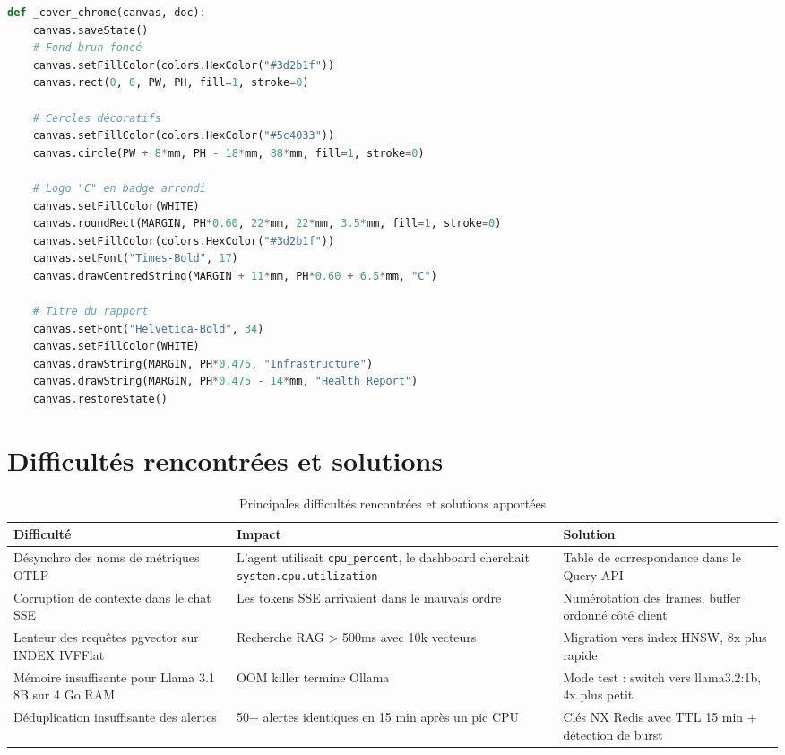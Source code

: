 \begin{lstlisting}[language=Python, caption={Extrait de \texttt{reports.py} --- page de couverture}]
def _cover_chrome(canvas, doc):
    canvas.saveState()
    # Fond brun foncé
    canvas.setFillColor(colors.HexColor("#3d2b1f"))
    canvas.rect(0, 0, PW, PH, fill=1, stroke=0)

    # Cercles décoratifs
    canvas.setFillColor(colors.HexColor("#5c4033"))
    canvas.circle(PW + 8*mm, PH - 18*mm, 88*mm, fill=1, stroke=0)

    # Logo "C" en badge arrondi
    canvas.setFillColor(WHITE)
    canvas.roundRect(MARGIN, PH*0.60, 22*mm, 22*mm, 3.5*mm, fill=1, stroke=0)
    canvas.setFillColor(colors.HexColor("#3d2b1f"))
    canvas.setFont("Times-Bold", 17)
    canvas.drawCentredString(MARGIN + 11*mm, PH*0.60 + 6.5*mm, "C")

    # Titre du rapport
    canvas.setFont("Helvetica-Bold", 34)
    canvas.setFillColor(WHITE)
    canvas.drawString(MARGIN, PH*0.475, "Infrastructure")
    canvas.drawString(MARGIN, PH*0.475 - 14*mm, "Health Report")
    canvas.restoreState()
\end{lstlisting}

\section{Difficultés rencontrées et solutions}

\begin{table}[H]
\centering
\caption{Principales difficultés rencontrées et solutions apportées}
\label{tab:difficultes}
\small
\begin{tabularx}{\textwidth}{lXX}
\toprule
\textbf{Difficulté} & \textbf{Impact} & \textbf{Solution} \\
\midrule
Désynchro des noms de métriques OTLP
  & L'agent utilisait \texttt{cpu\_percent}, le dashboard cherchait
    \texttt{system.cpu.utilization}
  & Table de correspondance dans le Query API \\
Corruption de contexte dans le chat SSE
  & Les tokens SSE arrivaient dans le mauvais ordre
  & Numérotation des frames, buffer ordonné côté client \\
Lenteur des requêtes pgvector sur INDEX IVFFlat
  & Recherche RAG > 500ms avec 10k vecteurs
  & Migration vers index HNSW, 8x plus rapide \\
Mémoire insuffisante pour Llama 3.1 8B sur 4 Go RAM
  & OOM killer termine Ollama
  & Mode test : switch vers llama3.2:1b, 4x plus petit \\
Déduplication insuffisante des alertes
  & 50+ alertes identiques en 15 min après un pic CPU
  & Clés NX Redis avec TTL 15 min + détection de burst \\
\bottomrule
\end{tabularx}
\end{table}

